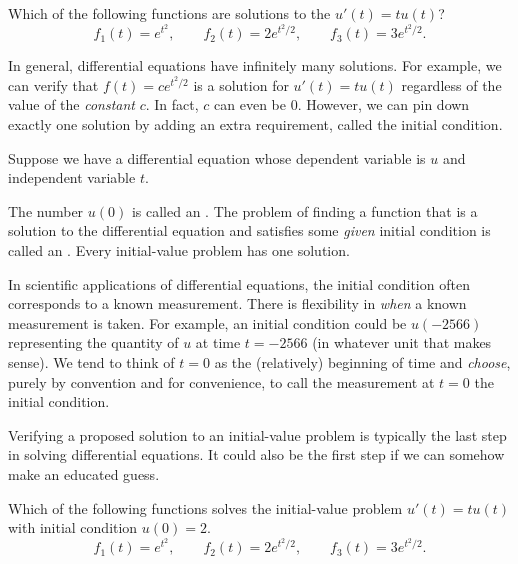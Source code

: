 \documentclass[../main.tex]{subfiles}
\begin{document}
\begin{example}
  Which of the following functions are solutions to the \(u'(t) = t u(t)\)?
  \[
    f_{1}(t) = e^{t^{2}}, \qquad f_{2}(t) = 2e^{t^{2}/2}, \qquad f_{3}(t) = 3e^{t^{2}/2}.
  \]
\end{example}
\clearpage

In general, differential equations have infinitely many solutions. For example, we can verify that \(f(t) = c e^{t^{2}/2}\) is a solution for \(u'(t) = t u(t)\) regardless of the value of the \emph{constant} \(c\). In fact, \(c\) can even be \(0\).  However, we can pin down exactly one solution by adding an extra requirement, called the initial condition.

\begin{definition}
  Suppose we have a differential equation whose dependent variable is \(u\) and independent variable \(t\). 

  The number \(u(0)\) is called an .  The problem of finding a function that is a solution to the differential equation and satisfies some \emph{given} initial condition is called an . Every initial-value problem has  one solution. 
\end{definition}

\faPencil*{} In scientific applications of differential equations, the initial condition often corresponds to a known measurement. There is flexibility in \emph{when} a known measurement is taken. For example, an initial condition could be \(u(-2566)\) representing the quantity of \(u\) at time \(t = -2566\) (in whatever unit that makes sense).  We tend to think of \(t = 0\) as the (relatively) beginning of time and \emph{choose}, purely by convention and for convenience, to call the measurement at \(t = 0\) the initial condition.

\bigskip
Verifying a proposed solution to an initial-value problem is typically the last step in solving differential equations. It could also be the first step if we can somehow make an educated guess.
\begin{example}
  Which of the following functions solves the initial-value problem \(u'(t) = t u(t)\) with initial condition \(u(0) = 2\).
  \[
    f_{1}(t) = e^{t^{2}}, \qquad f_{2}(t) = 2e^{t^{2}/2}, \qquad f_{3}(t) = 3e^{t^{2}/2}.
  \]
\end{example}
\clearpage
\end{document}
